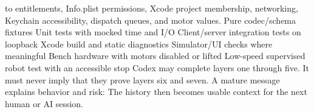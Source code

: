 {}to entitlements, Info.plist permissions, Xcode project membership, networking,\markdownRendererSoftLineBreak
{}Keychain accessibility, dispatch queues, and motor values.\markdownRendererInterblockSeparator
{}
\markdownRendererSectionEnd \markdownRendererSectionBegin
{}\markdownRendererInterblockSeparator
{}\markdownRendererOlBegin
{}Pure codec/schema fixtures\markdownRendererOlItemEnd 
{}Unit tests with mocked time and I/O\markdownRendererOlItemEnd 
{}Client/server integration tests on loopback\markdownRendererOlItemEnd 
{}Xcode build and static diagnostics\markdownRendererOlItemEnd 
{}Simulator/UI checks where meaningful\markdownRendererOlItemEnd 
{}Bench hardware with motors disabled or lifted\markdownRendererOlItemEnd 
{}Low-speed supervised robot test with an accessible stop\markdownRendererOlItemEnd 
\markdownRendererOlEnd \markdownRendererInterblockSeparator
{}Codex may complete layers one through five. It must never imply that they prove\markdownRendererSoftLineBreak
{}layers six and seven.\markdownRendererInterblockSeparator
{}
\markdownRendererSectionEnd \markdownRendererSectionBegin
{}\markdownRendererInterblockSeparator
{}A mature message explains behavior and risk:\markdownRendererInterblockSeparator
{}\markdownRendererInterblockSeparator
{}The history then becomes usable context for the next human or AI session.\markdownRendererInterblockSeparator
{}\markdownRendererThematicBreak{}\markdownRendererInterblockSeparator
{}
\markdownRendererSectionEnd 
\markdownRendererSectionEnd \markdownRendererSectionBegin
{}\markdownRendererInterblockSeparator
{}\markdownRendererSectionBegin
{}\markdownRendererInterblockSeparator
{}\markdownRendererInterblockSeparator
{}
\markdownRendererSectionEnd \markdownRendererSectionBegin
{}\markdownRendererInterblockSeparator
